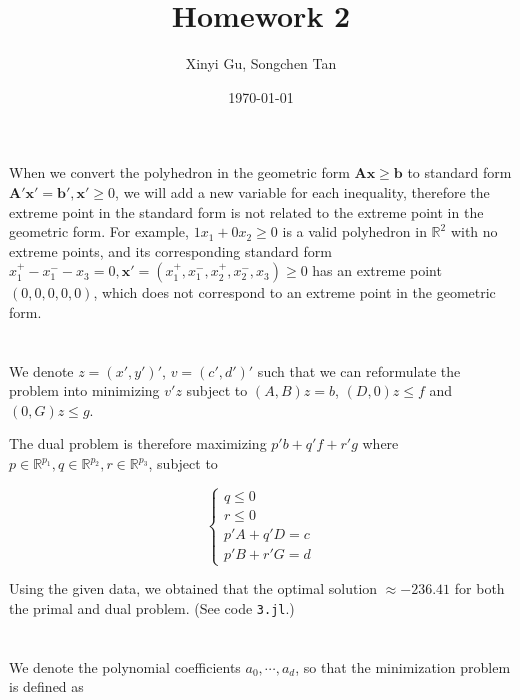 \documentclass{article}
\title{Homework 2}
\author{Xinyi Gu, Songchen Tan}
\date{\today}
\newcommand{\A}{\bm A}
\newcommand{\x}{\bm x}
\renewcommand{\b}{\bm b}
\newcommand{\1}{\bm 1}
\begin{document}
\maketitle
\section{}
When we convert the polyhedron in the geometric form $\A\x\ge\b$ to standard form $\A'\x'=\b',\x'\ge0$, we will add a new variable for each inequality, therefore the extreme point in the standard form is not related to the extreme point in the geometric form. For example, $1x_1+0x_2\ge0$ is a valid polyhedron in $\mathbb R^2$ with no extreme points, and its corresponding standard form $x_1^+-x_1^--x_3=0, \x'=(x_1^+,x_1^-,x_2^+,x_2^-,x_3)\ge0$ has an extreme point $(0, 0, 0, 0, 0)$, which does not correspond to an extreme point in the geometric form.

\section{}

\section{}
We denote $z=(x',y')'$, $v=(c',d')'$ such that we can reformulate the problem into minimizing $v'z$ subject to $(A, B)z=b$, $(D, 0)z\le f$ and $(0, G)z\le g$.

The dual problem is therefore maximizing $p'b+q'f+r'g$ where $p\in\mathbb R^{p_1}, q\in\mathbb R^{p_2}, r\in\mathbb R^{p_3}$, subject to

$$
\begin{cases}
    q\le 0\\
    r\le 0\\
    p'A+q'D=c\\
    p'B+r'G=d
\end{cases}
$$

Using the given data, we obtained that the optimal solution $\approx -236.41$ for both the primal and dual problem. (See code \verb|3.jl|.)

\section{}
\subsection{}

We denote the polynomial coefficients $a_0, \cdots, a_d$, so that the minimization problem is defined as
\end{document}
